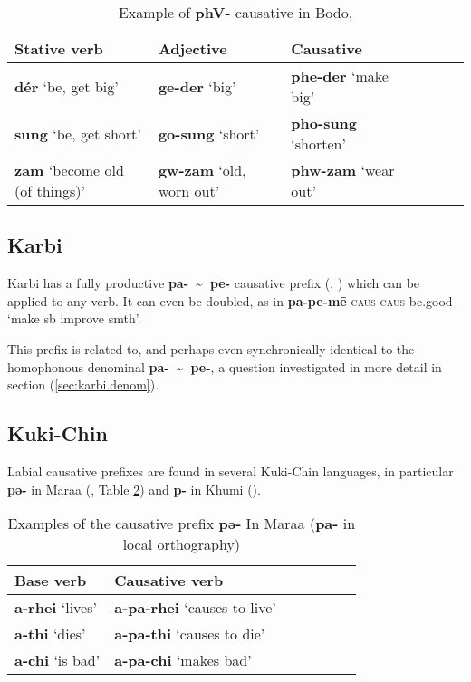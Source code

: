 \documentclass[oneside,a4paper,11pt]{article}
\newcommand{\ipa}[1]{\textbf{{\phon\mbox{#1}}}} %
\newcommand{\bodo}[2]{\ipa{#1} `#2'}
\newcommand{\refb}[1]{(\ref{#1})}
\newcommand{\tld}{\textasciitilde{}}
\begin{document}
\begin{table}[H]
\caption{Example of \ipa{phV-} causative in Bodo, \citet[54]{delancey15adjectival}} \label{tab:bodo.phV}
\begin{tabular}{lllllll}
\toprule
Stative verb & Adjective & Causative \\
\midrule
\bodo{dér}{be, get big} &\bodo{ge-der}{big} & \bodo{phe-der}{make big} \\
\bodo{sung}{be, get short} & \bodo{go-sung}{short} & \bodo{pho-sung}{shorten} \\
\bodo{zam}{become old (of things)} & \bodo{gw-zam}{old, worn out} & \bodo{phw-zam}{wear out} \\
\bottomrule
\end{tabular}
\end{table}

\subsection{Karbi} \label{sec:karbi}
Karbi has a fully productive \ipa{pa- \tld{} pe-} causative prefix (\citealt[93-4]{gruessner78mikir}, \citealt[238-9]{konnerth14karbi}) which can be applied to any verb. It can even be doubled, as in \ipa{pa-pe-mē} \textsc{caus-caus}-be.good `make sb improve smth'.

This prefix is related to, and perhaps even synchronically identical to the homophonous denominal \ipa{pa- \tld{} pe-}, a question investigated in more detail in section \refb{sec:karbi.denom}.

\subsection{Kuki-Chin}
Labial causative prefixes are found in several Kuki-Chin languages, in particular \ipa{pə-} in Maraa (\citealt[139]{hartmann01prenasalization}, Table \ref{tab:maraa}) and \ipa{p-} in Khumi (\citealt[99]{peterson10elaborate}). 

\begin{table}[H]
\caption{Examples of the causative prefix \ipa{pə-} In Maraa (\ipa{pa-} in local orthography)} \centering \label{tab:maraa}
\begin{tabular}{lllllll}
\toprule
Base verb & Causative verb \\
\midrule
\ipa{a-rhei} `lives' & \ipa{a-pa-rhei} `causes to live' & \\
\ipa{a-thi} `dies' & \ipa{a-pa-thi} `causes to die' & \\
\ipa{a-chi}  `is bad' & \ipa{a-pa-chi} `makes bad' & \\
\bottomrule
\end{tabular}
\end{table}
\end{document}
